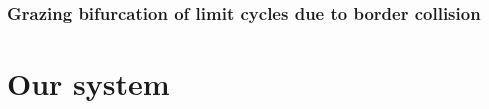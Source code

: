 \documentclass{book}
\renewcommand{\(}{\begin{columns}}
\renewcommand{\)}{\end{columns}}
\newcommand{\<}[1]{\begin{column}{#1}}
\renewcommand{\>}{\end{column}}
\newtheorem{claim}{Claim}[section]
\begin{document}
%
%
%
%
%
%
%


\subsection{Grazing bifurcation of limit cycles due to border collision}



\chapter{Our system}












{}

\end{document}
